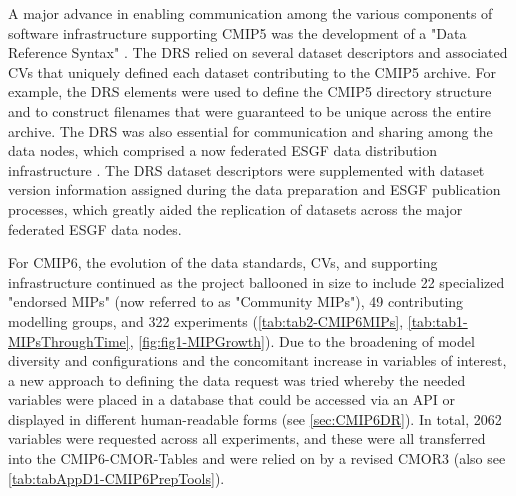 \documentclass[manuscript]{copernicus}
\begin{document}
A major advance in enabling communication among the various components of software infrastructure supporting CMIP5 was the development of a "Data Reference Syntax" \citep[DRS;][]{taylor_pcmdi_2012}. The DRS relied on several dataset descriptors and associated CVs that uniquely defined each dataset contributing to the CMIP5 archive. For example, the DRS elements were used to define the CMIP5 directory structure and to construct filenames that were guaranteed to be unique across the entire archive. The DRS was also essential for communication and sharing among the data nodes, which comprised a now federated ESGF data distribution infrastructure \citep[\autoref{sec:earthSystemGridFederation};][]{williams_earth_2011}. The DRS dataset descriptors were supplemented with dataset version information assigned during the data preparation and ESGF publication processes, which greatly aided the replication of datasets across the major federated ESGF data nodes.

For CMIP6, the evolution of the data standards, CVs, and supporting infrastructure continued as the project ballooned in size to include 22 specialized "endorsed MIPs" (now referred to as "Community MIPs"), 49 contributing modelling groups, and 322 experiments (\autoref{tab:tab2-CMIP6MIPs}, \autoref{tab:tab1-MIPsThroughTime}, \autoref{fig:fig1-MIPGrowth}). Due to the broadening of model diversity and configurations and the concomitant increase in variables of interest, a new approach to defining the data request was tried whereby the needed variables were placed in a database that could be accessed via an API or displayed in different human-readable forms (see \autoref{sec:CMIP6DR}). In total, 2062 variables were requested across all experiments, and these were all transferred into the CMIP6-CMOR-Tables \citep{nadeau_cmip6_2017} and were relied on by a revised CMOR3 \citep{mauzey_cmor_2024} (also see \autoref{tab:tabAppD1-CMIP6PrepTools}).
\end{document}
